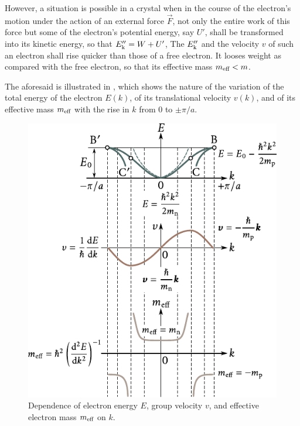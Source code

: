 However, a situation is possible in a crystal when in the course of the electron's motion under the action of an external force $\vec{F}$, not only the entire work of this force but some of the electron's potential
energy, say $U'$, shall be transformed into its kinetic energy, so that $E_{\text{k}}''=W+U'$, The $E_{\text{k}}''$ and the velocity $v$ of such an electron shall rise quicker than those of a free electron. It looses weight as compared with the free electron, so that its effective mass $m_{\text{eff}}<m$.

The aforesaid is illustrated in , which shows the nature of the variation of the total energy of the electron $E(k)$, of its translational velocity $v(k)$, and of its effective mass $m_{\text{eff}}$ with the rise in $k$ from $0$ to $\pm\pi/a$.

\begin{figure}[t]
	\begin{center}
		\includegraphics[scale=1]{figures/ch_05/fig_5_12.pdf}
		\caption[]{Dependence of electron energy $E$, group velocity $v$, and effective electron mass $m_{\text{eff}}$ on $k$.}
		\label{fig:5_12}
	\end{center}
	\vspace{-0.7cm}
\end{figure}

